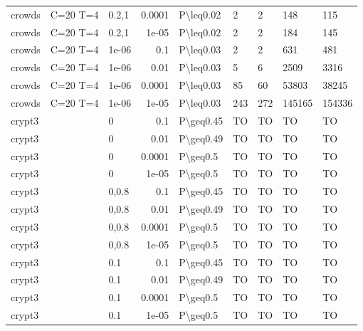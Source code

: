 \begin{longtable}{lllrlllll}
 crowds        & C=20 T=4  & 0.2,1 & 0.0001 & P\textbackslash{}leq0.02  & 2    & 2    & 148      & 115     \\
 crowds        & C=20 T=4  & 0.2,1 & 1e-05  & P\textbackslash{}leq0.02  & 2    & 2    & 184      & 145     \\
 crowds        & C=20 T=4  & 1e-06 & 0.1    & P\textbackslash{}leq0.03  & 2    & 2    & 631      & 481     \\
 crowds        & C=20 T=4  & 1e-06 & 0.01   & P\textbackslash{}leq0.03  & 5    & 6    & 2509     & 3316    \\
 crowds        & C=20 T=4  & 1e-06 & 0.0001 & P\textbackslash{}leq0.03  & 85   & 60   & 53803    & 38245   \\
 crowds        & C=20 T=4  & 1e-06 & 1e-05  & P\textbackslash{}leq0.03  & 243  & 272  & 145165   & 154336  \\
 crypt3        &           & 0     & 0.1    & P\textbackslash{}geq0.45  & TO   & TO   & TO       & TO      \\
 crypt3        &           & 0     & 0.01   & P\textbackslash{}geq0.49  & TO   & TO   & TO       & TO      \\
 crypt3        &           & 0     & 0.0001 & P\textbackslash{}geq0.5   & TO   & TO   & TO       & TO      \\
 crypt3        &           & 0     & 1e-05  & P\textbackslash{}geq0.5   & TO   & TO   & TO       & TO      \\
 crypt3        &           & 0,0.8 & 0.1    & P\textbackslash{}geq0.45  & TO   & TO   & TO       & TO      \\
 crypt3        &           & 0,0.8 & 0.01   & P\textbackslash{}geq0.49  & TO   & TO   & TO       & TO      \\
 crypt3        &           & 0,0.8 & 0.0001 & P\textbackslash{}geq0.5   & TO   & TO   & TO       & TO      \\
 crypt3        &           & 0,0.8 & 1e-05  & P\textbackslash{}geq0.5   & TO   & TO   & TO       & TO      \\
 crypt3        &           & 0.1   & 0.1    & P\textbackslash{}geq0.45  & TO   & TO   & TO       & TO      \\
 crypt3        &           & 0.1   & 0.01   & P\textbackslash{}geq0.49  & TO   & TO   & TO       & TO      \\
 crypt3        &           & 0.1   & 0.0001 & P\textbackslash{}geq0.5   & TO   & TO   & TO       & TO      \\
 crypt3        &           & 0.1   & 1e-05  & P\textbackslash{}geq0.5   & TO   & TO   & TO       & TO      \\

\end{longtable}
